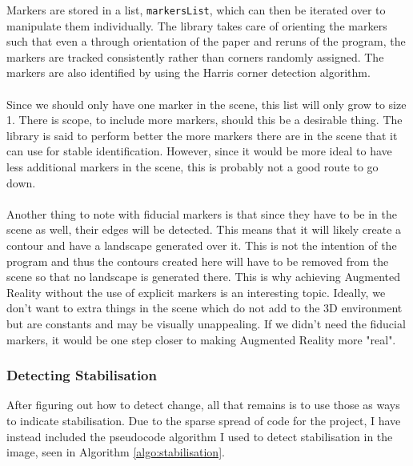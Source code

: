 \documentclass[11pt]{article}
\begin{document}
Markers are stored in a list, \texttt{markersList}, which can then be 
iterated over to manipulate them individually. The library takes care
of orienting the markers such that even a through orientation of the
paper and reruns of the program, the markers are tracked consistently 
rather than corners randomly assigned. The markers are also identified
by using the Harris corner detection algorithm.\\
\\
Since we should only have one marker in the scene, this list will 
only grow to size 1. There is scope, to include more markers,
should this be a desirable thing. The library is said to perform
better the more markers there are in the scene that it can use for
stable identification. However, since it would be more ideal to have 
less additional markers in the scene, this is probably not a good route
to go down.\\
\\
Another thing to note with fiducial markers is that since they have to be
in the scene as well, their edges will be detected. This means that it
will likely create a contour and have a landscape generated over it. This is
not the intention of the program and thus the contours created here will
have to be removed from the scene so that no landscape is generated there.
This is why achieving Augmented Reality without the use of explicit 
markers is an interesting topic. Ideally, we don't want to extra things 
in the scene which do not add to the 3D environment but are constants and
may be visually unappealing. If we didn't need the fiducial markers, it would
be one step closer to making Augmented Reality more "real".

\subsubsection{Detecting Stabilisation}
After figuring out how to detect change, all that remains is to use those
as ways to indicate stabilisation. Due to the sparse spread of code
for the project, I have instead included the pseudocode algorithm I 
used to detect stabilisation in the image, seen in 
Algorithm \ref{algo:stabilisation}. 
\end{document}
